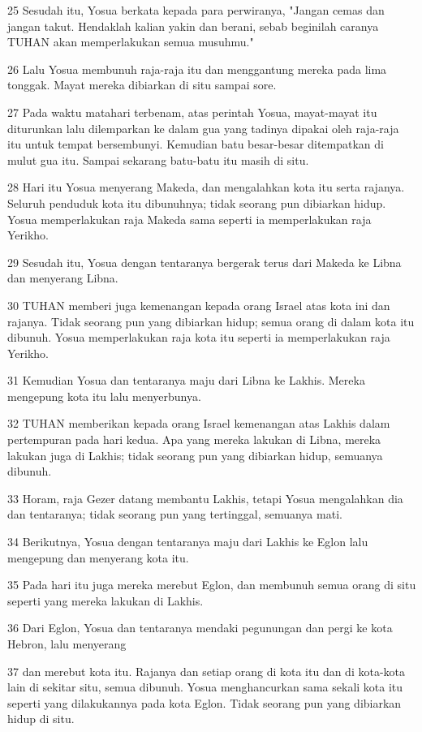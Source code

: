 \par 25 Sesudah itu, Yosua berkata kepada para perwiranya, "Jangan cemas dan jangan takut. Hendaklah kalian yakin dan berani, sebab beginilah caranya TUHAN akan memperlakukan semua musuhmu."
\par 26 Lalu Yosua membunuh raja-raja itu dan menggantung mereka pada lima tonggak. Mayat mereka dibiarkan di situ sampai sore.
\par 27 Pada waktu matahari terbenam, atas perintah Yosua, mayat-mayat itu diturunkan lalu dilemparkan ke dalam gua yang tadinya dipakai oleh raja-raja itu untuk tempat bersembunyi. Kemudian batu besar-besar ditempatkan di mulut gua itu. Sampai sekarang batu-batu itu masih di situ.
\par 28 Hari itu Yosua menyerang Makeda, dan mengalahkan kota itu serta rajanya. Seluruh penduduk kota itu dibunuhnya; tidak seorang pun dibiarkan hidup. Yosua memperlakukan raja Makeda sama seperti ia memperlakukan raja Yerikho.
\par 29 Sesudah itu, Yosua dengan tentaranya bergerak terus dari Makeda ke Libna dan menyerang Libna.
\par 30 TUHAN memberi juga kemenangan kepada orang Israel atas kota ini dan rajanya. Tidak seorang pun yang dibiarkan hidup; semua orang di dalam kota itu dibunuh. Yosua memperlakukan raja kota itu seperti ia memperlakukan raja Yerikho.
\par 31 Kemudian Yosua dan tentaranya maju dari Libna ke Lakhis. Mereka mengepung kota itu lalu menyerbunya.
\par 32 TUHAN memberikan kepada orang Israel kemenangan atas Lakhis dalam pertempuran pada hari kedua. Apa yang mereka lakukan di Libna, mereka lakukan juga di Lakhis; tidak seorang pun yang dibiarkan hidup, semuanya dibunuh.
\par 33 Horam, raja Gezer datang membantu Lakhis, tetapi Yosua mengalahkan dia dan tentaranya; tidak seorang pun yang tertinggal, semuanya mati.
\par 34 Berikutnya, Yosua dengan tentaranya maju dari Lakhis ke Eglon lalu mengepung dan menyerang kota itu.
\par 35 Pada hari itu juga mereka merebut Eglon, dan membunuh semua orang di situ seperti yang mereka lakukan di Lakhis.
\par 36 Dari Eglon, Yosua dan tentaranya mendaki pegunungan dan pergi ke kota Hebron, lalu menyerang
\par 37 dan merebut kota itu. Rajanya dan setiap orang di kota itu dan di kota-kota lain di sekitar situ, semua dibunuh. Yosua menghancurkan sama sekali kota itu seperti yang dilakukannya pada kota Eglon. Tidak seorang pun yang dibiarkan hidup di situ.
